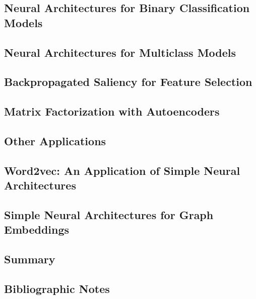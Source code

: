 \documentclass[a4paper]{article}
\begin{document}
\subsection{Neural Architectures for Binary Classification Models}

\subsection{Neural Architectures for Multiclass Models}

\subsection{Backpropagated Saliency for Feature Selection}

\subsection{Matrix Factorization with Autoencoders}

\subsection{Other Applications}

\subsection{Word2vec: An Application of Simple Neural Architectures}

\subsection{Simple Neural Architectures for Graph Embeddings}

\subsection{Summary}

\subsection{Bibliographic Notes}
\end{document}
